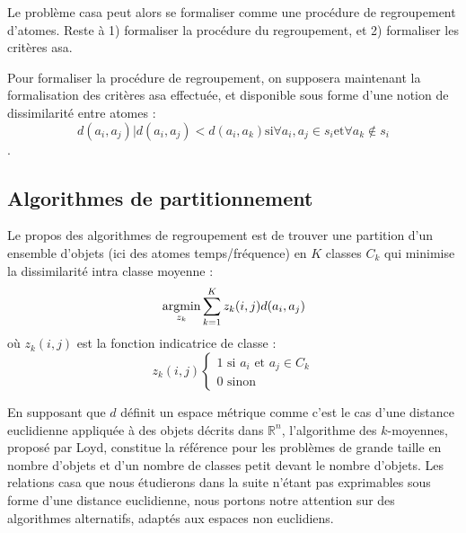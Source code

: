 Le problème casa peut alors se formaliser comme une procédure de regroupement d'atomes. Reste à 1) formaliser la procédure du regroupement, et 2) formaliser les critères asa.

Pour formaliser la procédure de regroupement, on supposera maintenant la formalisation des critères asa effectuée, et disponible sous forme d'une notion de dissimilarité entre atomes : $$d(a_i, a_j) | d(a_i, a_j) < d(a_i, a_k) \text{si} \forall a_i, a_j \in s_i \text{et} \forall a_k \notin s_i$$.

\subsection{Algorithmes de partitionnement}


Le propos des algorithmes de regroupement est de trouver une partition d'un ensemble d'objets (ici des atomes temps/fréquence) en $K$ classes $C_k$ qui minimise la dissimilarité intra classe moyenne :
\begin{equation}
  \operatorname*{argmin}_{z_k} \sum_{k=1}^{K} z_k(i, j) d(a_i, a_j)
\end{equation}
où $z_k(i, j)$ est la fonction indicatrice de classe :
\begin{equation}
  z_k(i, j)
  \begin{cases}
    1 \text{ si } a_i \text{ et } a_j \in C_k \\
    0 \text{ sinon}
  \end{cases}
\end{equation}

En supposant que $d$ définit un espace métrique comme c'est le cas d'une distance euclidienne appliquée à des objets décrits dans $\mathbb{R}^n$, l'algorithme des $k$-moyennes, proposé par Loyd\cite{lloyd1982least}, constitue la référence pour les problèmes de grande taille en nombre d'objets et d'un nombre de classes petit devant le nombre d'objets. Les relations casa que nous étudierons dans la suite n'étant pas exprimables sous forme d'une distance euclidienne, nous portons notre attention sur des algorithmes alternatifs, adaptés aux espaces non euclidiens.

